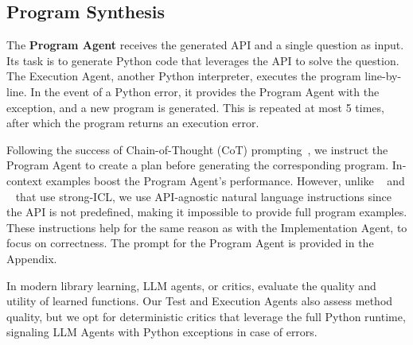 \subsection{Program Synthesis}
 
The \textbf{Program Agent} receives the generated API and a single question as input. Its task is to generate Python code that leverages the API to solve the question. The Execution Agent, another Python interpreter, executes the program line-by-line. In the event of a Python error, it provides the Program Agent with the exception, and a new program is generated. This is repeated at most 5 times, after which the program returns an execution error.

Following the success of Chain-of-Thought (CoT) prompting~\cite{cot}, we instruct the Program Agent to create a plan before generating the corresponding program. In-context examples boost the Program Agent’s performance. However, unlike \visprog~\cite{visprog} and \viper~\cite{vipergpt} that use strong-ICL, we use API-agnostic natural language instructions since the API is not predefined, making it impossible to provide full program examples. These instructions help for the same reason as with the Implementation Agent, to focus on correctness. The prompt for the Program Agent is provided in the Appendix.

In modern library learning, LLM agents, or critics, evaluate the quality and utility of learned functions. Our Test and Execution Agents also assess method quality, but we opt for deterministic critics that leverage the full Python runtime, signaling LLM Agents with Python exceptions in case of errors.
